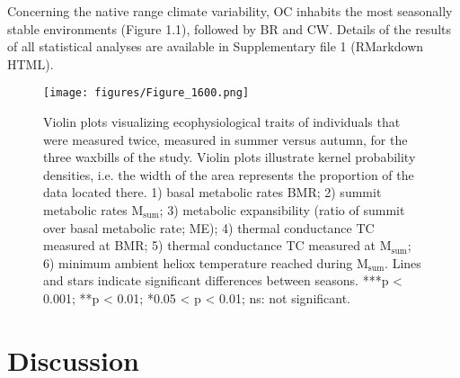 \documentclass[10pt, twoside]{book} %
\begin{document}
Concerning the native range climate variability, OC inhabits the most seasonally stable environments (Figure 1.1), followed by BR and CW. Details of the results of all statistical analyses are available in Supplementary file 1 (RMarkdown HTML).\\

\clearpage

\renewcommand{\thefigure}{1.\arabic{figure}}
	\begin{figure}[h!]
		\begin{center}
\small
			\texttt{[image: figures/Figure\_1600.png]}
		\end{center}
		\begin{footnotesize}
			\caption{\footnotesize Violin plots visualizing ecophysiological traits of individuals that were measured twice, measured in summer versus autumn, for the three waxbills of the study. Violin plots illustrate kernel probability densities, i.e. the width of the area represents the proportion of the data located there. 1) basal metabolic rates BMR; 2) summit metabolic rates M$_{\text{sum}}$; 3) metabolic expansibility (ratio of summit over basal metabolic rate; ME); 4) thermal conductance TC measured at BMR; 5) thermal conductance TC measured at M$_{\text{sum}}$; 6) minimum ambient heliox temperature reached during M$_{\text{sum}}$. Lines and stars indicate significant differences between seasons. ***p < 0.001; **p < 0.01; *0.05 < p < 0.01; ns: not significant.\label{fig1.2}}
		\end{footnotesize}
	\end{figure}
\clearpage

\section{Discussion}
\renewcommand\thesection{\arabic{chapter}.\arabic{section}}
\renewcommand{\thefigure}{\arabic{chapter}.\arabic{figure}}
\end{document}
